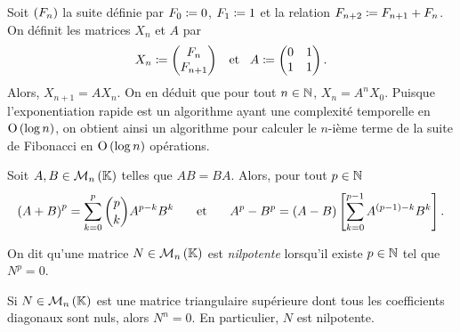 \documentclass{magnolia}
\begin{document}
\begin{remarqueUnique}
  \remarque Soit $\left(F_n\right)$ la suite définie par $F_0\coloneqq 0$, $F_1\coloneqq 1$
  et la relation $F_{n+2}\coloneqq F_{n+1}+F_n$. On définit les matrices $X_n$
  et $A$ par
  \[X_n\coloneqq
    \begin{pmatrix}
    F_n \\ F_{n+1}
    \end{pmatrix} \quad\!\text{et}\quad\!
    A\coloneqq
    \begin{pmatrix}
    0 & 1\\
    1 & 1  
    \end{pmatrix}.\]
  Alors, $X_{n+1}=A X_n$. On en déduit que pour tout $n\in\mathbb{N}$, $X_n=A^n X_0$.
  Puisque l'exponentiation rapide est
  un algorithme ayant une complexité temporelle en ${\rm O}\left(\log n\right)$, on obtient ainsi un
  algorithme pour calculer le $n$-ième terme de la suite de Fibonacci en ${\rm O}\left(\log n\right)$
  opérations.
\end{remarqueUnique}




\begin{proposition}
Soit $A,B\in\mathcal{M}_{n}\left(\mathbb{K}\right)$ telles que $AB=BA$. Alors, pour tout $p\in\mathbb{N}$
\[\left(A+B\right)^p = \sum_{k=0}^p \binom{p}{k} A^{p-k} B^k \quad\quad\!\text{et}\quad\!\quad
   A^p-B^p=\left(A-B\right)\left[\sum_{k=0}^{p-1} A^{\left(p-1\right)-k} B^k\right].\]
\end{proposition}

\begin{definition}
On dit qu'une matrice $N\in\mathcal{M}_{n}\left(\mathbb{K}\right)$ est \emph{nilpotente} lorsqu'il existe $p\in\mathbb{N}$ tel que $N^p=0$.
\end{definition}

\begin{proposition}
Si $N\in\mathcal{M}_{n}\left(\mathbb{K}\right)$ est une matrice triangulaire supérieure dont tous les
coefficients diagonaux sont nuls, alors $N^n=0$. En particulier, $N$ est nilpotente.
\end{proposition}
\end{document}
